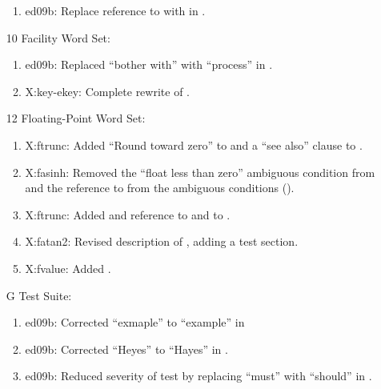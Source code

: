 \begin{itemize}
\begin{enumerate}
		\item \textsf{ed09b}: Replace reference to
			 with 
			in .
		\end{enumerate}

	\item[10] Facility Word Set:
		\begin{enumerate}
		\item \textsf{ed09b}: Replaced ``bother with'' with
			``process'' in .
		\item \textsf{X:key-ekey}: Complete rewrite of
			.
		\end{enumerate}

	\item[12] Floating-Point Word Set:
		\begin{enumerate}
		\item \textsf{X:ftrunc}: Added ``Round toward zero'' to 
			and a ``see also'' clause to .
		\item \textsf{X:fasinh}: Removed the ``float less than zero'' ambiguous
			condition from  and the reference to
			 from the ambiguous conditions
			().
		\item \textsf{X:ftrunc}: Added and reference to
			 and to .
		\item \textsf{X:fatan2}: Revised description of
			, adding a test section.
		\item \textsf{X:fvalue}: Added .
		\end{enumerate}

	\item[G] Test Suite:
		\begin{enumerate}
		\item \textsf{ed09b}: Corrected ``exmaple'' to ``example'' in
		\item \textsf{ed09b}: Corrected ``Heyes'' to ``Hayes''
			in .
		\item \textsf{ed09b}: Reduced severity of test by replacing
			``must'' with ``should'' in .
		\end{enumerate}
	\end{itemize}


